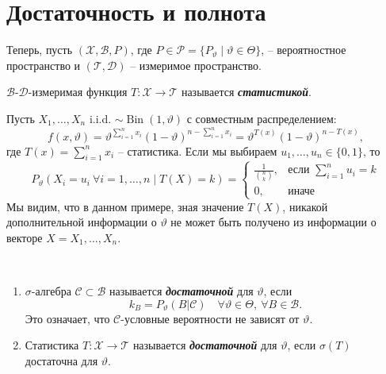 \chapter{Достаточность и полнота}

Теперь, пусть $(\mathcal{X}, \mathcal{B}, P)$, где $P \in \mathcal{P} = \{P_\vartheta \mid \vartheta \in \Theta \} $, -- вероятностное пространство и $(\mathcal{T}, \mathcal{D})$ -- измеримое пространство.

\begin{defn}
	$\mathcal{B}$-$\mathcal{D}$-измеримая функция $T:\mathcal{X} \rightarrow \mathcal{T}$ называется \textbf{\textit{статистикой}}.
\end{defn}

\begin{exmp} \label{exmp4.2}
	Пусть $X_1, \dots, X_n$ i.i.d. $\sim \operatorname{Bin}(1, \vartheta)$ с совместным распределением:
	\[ f(x, \vartheta) = \vartheta^{\sum_{i=1}^{n}x_i}(1-\vartheta)^{n-\sum_{i=1}^{n}x_i}=\vartheta^{T(x)}(1-\vartheta)^{n-T(x)}, \]
	где $T(x)=\sum_{i=1}^{n}x_i$ -- статистика.
	Если мы выбираем $u_1, \dots, u_n \in \{0,1\}$, то
	\[
		P_\vartheta(X_i=u_i \  \forall i = 1, \dots, n \mid T(X)=k)=\left \{
		\begin{array}{cl}
		\frac{1}{\binom{n}{k}}, & \text{если } \sum_{i=1}^{n}u_i=k \\
		0, & \text{иначе}
		\end{array}
		\right.
	\]
	Мы видим, что в данном примере, зная значение $T(X)$, никакой дополнительной информации о $\vartheta$ не может быть получено из информации о векторе $X=X_1, \dots, X_n$.
\end{exmp}

\begin{defn} \
	\begin{enumerate}
		\item $\sigma$-алгебра $\mathcal{C} \subset \mathcal{B}$ называется \textbf{\textit{достаточной}} для $\vartheta$, если
		\[ k_B=P_\vartheta(B | \mathcal{C}) \quad \forall \vartheta \in \Theta,\ \forall B \in \mathcal{B}. \]
		Это означает, что $\mathcal{C}$-условные вероятности не зависят от $\vartheta$.
		\item Статистика $T\colon\mathcal{X} \rightarrow \mathcal{T}$ называется \textbf{\textit{достаточной}} для $\vartheta$, если $\sigma(T)$ достаточна для $\vartheta$.
	\end{enumerate}
\end{defn}

